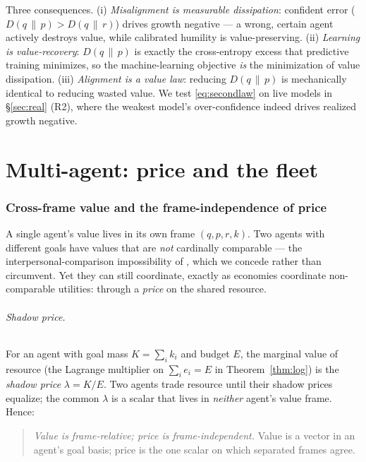 \documentclass[11pt]{article}
\theoremstyle{plain}
\theoremstyle{definition}
\theoremstyle{remark}
\newcommand{\KL}[2]{D\!\left(#1\,\|\,#2\right)}
\begin{document}
Three consequences. (i) \emph{Misalignment is measurable dissipation}: confident error ($\KL{q}{p}>\KL{q}{r}$) drives
growth negative --- a wrong, certain agent actively destroys value, while calibrated humility is
value-preserving. (ii) \emph{Learning is value-recovery}: $\KL{q}{p}$ is exactly the cross-entropy excess that
predictive training minimizes, so the machine-learning objective \emph{is} the minimization of value
dissipation. (iii) \emph{Alignment is a value law}: reducing $\KL{q}{p}$ is mechanically identical to reducing
wasted value. We test \eqref{eq:secondlaw} on live models in \S\ref{sec:real} (R2), where the weakest model's
over-confidence indeed drives realized growth negative.

\part{Multi-agent: price and the fleet}\label{part:multi}

\section{Cross-frame value and the frame-independence of price}\label{sec:crossframe}

A single agent's value lives in its own frame $(q,p,r,k)$. Two agents with different goals have values that are
\emph{not} cardinally comparable --- the interpersonal-comparison impossibility of \citet{arrow1951}, which we
concede rather than circumvent. Yet they can still coordinate, exactly as economies coordinate non-comparable
utilities: through a \emph{price} on the shared resource.

\paragraph{Shadow price.} For an agent with goal mass $K=\sum_i k_i$ and budget $E$, the marginal value of
resource (the Lagrange multiplier on $\sum_i e_i=E$ in Theorem~\ref{thm:log}) is the \emph{shadow price}
$\lambda=K/E$. Two agents trade resource until their shadow prices equalize; the common $\lambda$ is a scalar
that lives in \emph{neither} agent's value frame. Hence:
\begin{quote}
\emph{Value is frame-relative; price is frame-independent.} Value is a vector in an agent's goal basis; price is
the one scalar on which separated frames agree.
\end{quote}
\end{document}
